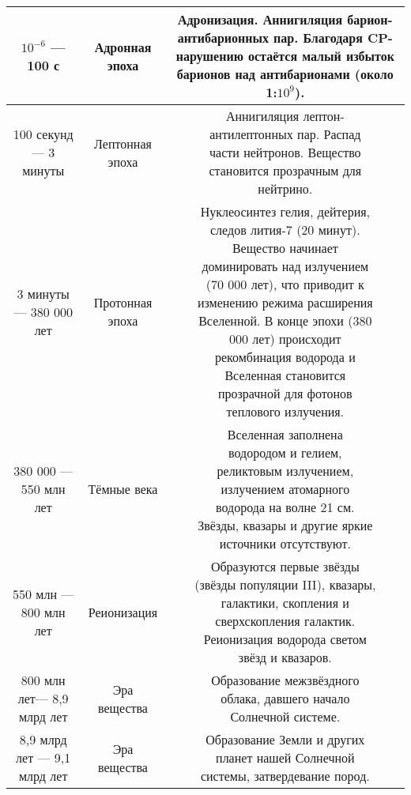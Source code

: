 \documentclass{article}
\makeatletter
\newcommand{\specialcell}[2][c]{%
  \begin{tabular}[#1]{@{}c@{}}#2\end{tabular}}
\makeatother
\begin{document}
\begin{center}
\begin{longtable}{|c|c|c|}
\hline
 $10^{-6}$ — 100 с& Адронная эпоха& \specialcell{Адронизация. Аннигиляция\\ барион-антибарионных пар.\\ Благодаря CP-нарушению\\ остаётся малый избыток\\ барионов над антибарионами\\ (около 1:$10^9$).} \\
\hline
 100 секунд — 3 минуты& Лептонная эпоха& \specialcell{Аннигиляция лептон-\\антилептонных пар. Распад\\ части нейтронов. Вещество\\ становится прозрачным для\\ нейтрино.} \\
\hline
 3 минуты — 380 000 лет& Протонная эпоха& \specialcell{Нуклеосинтез гелия, дейтерия,\\ следов лития-7 (20 минут).\\ Вещество начинает\\ доминировать над излучением\\ (70 000 лет), что приводит к\\ изменению режима расширения\\ Вселенной. В конце эпохи (380\\ 000 лет) происходит\\рекомбинация водорода и\\ Вселенная становится\\ прозрачной для фотонов\\ теплового излучения.} \\
\hline
 380 000 — 550 млн лет& Тёмные века& \specialcell{Вселенная заполнена\\ водородом и гелием,\\ реликтовым излучением,\\ излучением атомарного\\ водорода на волне 21 см.\\ Звёзды, квазары и другие яркие \\источники отсутствуют.} \\
\hline
 550 млн — 800 млн лет& Реионизация& \specialcell{Образуются первые звёзды\\ (звёзды популяции III), квазары,\\ галактики, скопления и\\ сверхскопления галактик.\\ Реионизация водорода светом\\ звёзд и квазаров.} \\
\hline
 800 млн лет— 8,9 млрд лет& Эра вещества& \specialcell{Образование межзвёздного\\ облака, давшего начало\\ Солнечной системе.} \\
\hline
 8,9 млрд лет — 9,1 млрд лет& Эра вещества& \specialcell{Образование Земли и других\\ планет нашей Солнечной\\ системы, затвердевание пород.} \\
\hline
\end{longtable}
\end{center}
\end{document}
